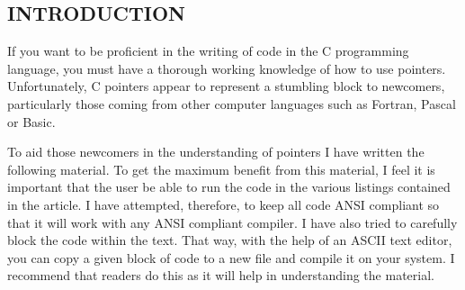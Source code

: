 \hypertarget{introduction}{%
\subsection{INTRODUCTION}\label{introduction}}

If you want to be proficient in the writing of code in the C programming
language, you must have a thorough working knowledge of how to use
pointers. Unfortunately, C pointers appear to represent a stumbling
block to newcomers, particularly those coming from other computer
languages such as Fortran, Pascal or Basic.

To aid those newcomers in the understanding of pointers I have written
the following material. To get the maximum benefit from this material, I
feel it is important that the user be able to run the code in the
various listings contained in the article. I have attempted, therefore,
to keep all code ANSI compliant so that it will work with any ANSI
compliant compiler. I have also tried to carefully block the code within
the text. That way, with the help of an ASCII text editor, you can copy
a given block of code to a new file and compile it on your system. I
recommend that readers do this as it will help in understanding the
material.

\begin{comment}
\href{ch1x.htm}{Chapter 1: What is a Pointer?}

\href{pointers.htm}{Back to Table of Contents}
\end{comment}

